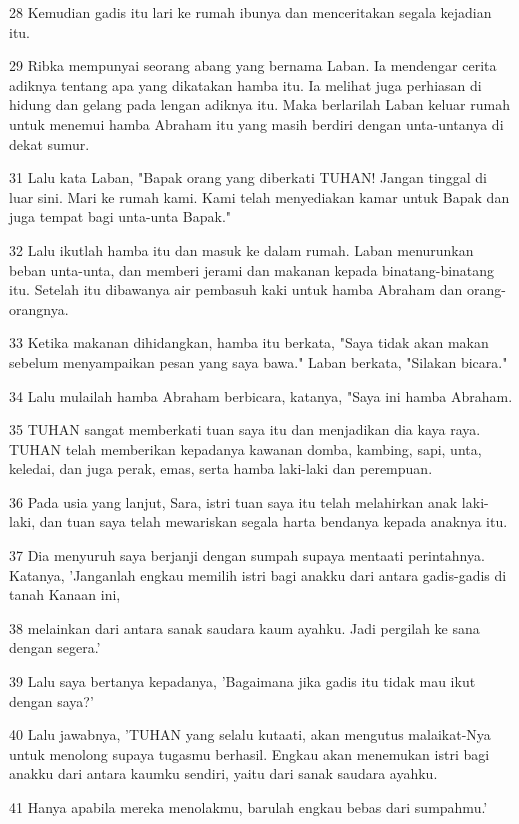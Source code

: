 \par 28 Kemudian gadis itu lari ke rumah ibunya dan menceritakan segala kejadian itu.
\par 29 Ribka mempunyai seorang abang yang bernama Laban. Ia mendengar cerita adiknya tentang apa yang dikatakan hamba itu. Ia melihat juga perhiasan di hidung dan gelang pada lengan adiknya itu. Maka berlarilah Laban keluar rumah untuk menemui hamba Abraham itu yang masih berdiri dengan unta-untanya di dekat sumur.
\par 31 Lalu kata Laban, "Bapak orang yang diberkati TUHAN! Jangan tinggal di luar sini. Mari ke rumah kami. Kami telah menyediakan kamar untuk Bapak dan juga tempat bagi unta-unta Bapak."
\par 32 Lalu ikutlah hamba itu dan masuk ke dalam rumah. Laban menurunkan beban unta-unta, dan memberi jerami dan makanan kepada binatang-binatang itu. Setelah itu dibawanya air pembasuh kaki untuk hamba Abraham dan orang-orangnya.
\par 33 Ketika makanan dihidangkan, hamba itu berkata, "Saya tidak akan makan sebelum menyampaikan pesan yang saya bawa." Laban berkata, "Silakan bicara."
\par 34 Lalu mulailah hamba Abraham berbicara, katanya, "Saya ini hamba Abraham.
\par 35 TUHAN sangat memberkati tuan saya itu dan menjadikan dia kaya raya. TUHAN telah memberikan kepadanya kawanan domba, kambing, sapi, unta, keledai, dan juga perak, emas, serta hamba laki-laki dan perempuan.
\par 36 Pada usia yang lanjut, Sara, istri tuan saya itu telah melahirkan anak laki-laki, dan tuan saya telah mewariskan segala harta bendanya kepada anaknya itu.
\par 37 Dia menyuruh saya berjanji dengan sumpah supaya mentaati perintahnya. Katanya, 'Janganlah engkau memilih istri bagi anakku dari antara gadis-gadis di tanah Kanaan ini,
\par 38 melainkan dari antara sanak saudara kaum ayahku. Jadi pergilah ke sana dengan segera.'
\par 39 Lalu saya bertanya kepadanya, 'Bagaimana jika gadis itu tidak mau ikut dengan saya?'
\par 40 Lalu jawabnya, 'TUHAN yang selalu kutaati, akan mengutus malaikat-Nya untuk menolong supaya tugasmu berhasil. Engkau akan menemukan istri bagi anakku dari antara kaumku sendiri, yaitu dari sanak saudara ayahku.
\par 41 Hanya apabila mereka menolakmu, barulah engkau bebas dari sumpahmu.'
